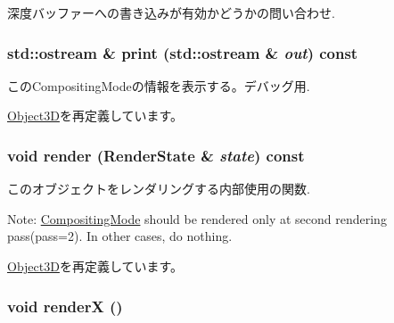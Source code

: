 深度バッファーへの書き込みが有効かどうかの問い合わせ. \hypertarget{classm3g_1_1CompositingMode_6fea17fa1532df3794f8cb39cb4f911f}{
\subsubsection[{print}]{\setlength{\rightskip}{0pt plus 5cm}std::ostream \& print (std::ostream \& {\em out}) const}}
\label{classm3g_1_1CompositingMode_6fea17fa1532df3794f8cb39cb4f911f}


このCompositingModeの情報を表示する。デバッグ用. 

\hyperlink{classm3g_1_1Object3D_6fea17fa1532df3794f8cb39cb4f911f}{Object3D}を再定義しています。\hypertarget{classm3g_1_1CompositingMode_8babc8a79b78615da51161e94029eea9}{
\subsubsection[{render}]{\setlength{\rightskip}{0pt plus 5cm}void render ({\bf RenderState} \& {\em state}) const}}
\label{classm3g_1_1CompositingMode_8babc8a79b78615da51161e94029eea9}


このオブジェクトをレンダリングする内部使用の関数.

Note: \hyperlink{classm3g_1_1CompositingMode}{CompositingMode} should be rendered only at second rendering pass(pass=2). In other cases, do nothing. 

\hyperlink{classm3g_1_1Object3D_8babc8a79b78615da51161e94029eea9}{Object3D}を再定義しています。\hypertarget{classm3g_1_1CompositingMode_443a7a301f77f625335ecc06d13bad06}{
\subsubsection[{renderX}]{\setlength{\rightskip}{0pt plus 5cm}void renderX ()}}
\label{classm3g_1_1CompositingMode_443a7a301f77f625335ecc06d13bad06}


